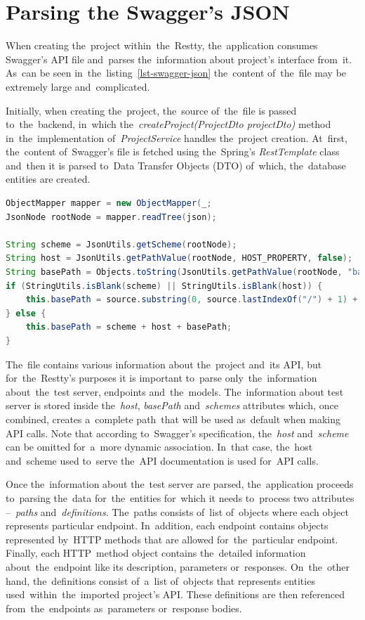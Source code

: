 \section{Parsing the Swagger's JSON}
When creating the~project within~the~Restty, the~application consumes Swagger's API file and~parses the~information
about project's interface from~it. As~can be seen in~the~listing~\ref{lst-swagger-json} the~content of~the~file may be extremely
large and~complicated. 

Initially, when creating the~project, the~source of~the~file is passed to~the~backend, in~which the~\textit{createProject(ProjectDto projectDto)}
method in~the~implementation of~\textit{ProjectService} handles the~project creation. At~first, the~content of~Swagger's file is fetched
using the~Spring's \textit{RestTemplate} class and~then it is parsed to~Data Transfer Objects (DTO) of~which, the~database entities are created.

\vspace{1mm}
\begin{lstlisting}[caption=Parsing the~address of~the~test server from~Swagger's API file.,
style=dp-default, language=Java]
ObjectMapper mapper = new ObjectMapper(_;
JsonNode rootNode = mapper.readTree(json);

String scheme = JsonUtils.getScheme(rootNode);
String host = JsonUtils.getPathValue(rootNode, HOST_PROPERTY, false);
String basePath = Objects.toString(JsonUtils.getPathValue(rootNode, "basePath", false), "");
if (StringUtils.isBlank(scheme) || StringUtils.isBlank(host)) {
	this.basePath = source.substring(0, source.lastIndexOf("/") + 1) + basePath;
} else {
	this.basePath = scheme + host + basePath;
}
\end{lstlisting}

The~file contains various information about the~project and~its API, but for~the~Restty's purposes it is important to~parse only~the~information
about~the~test server, endpoints and~the~models. The~information about test server is stored inside the~\textit{host}, \textit{basePath} and~\textit{schemes}
attributes which, once combined, creates a~complete path~that will be used as~default when making API calls. Note that according to~Swagger's specification,
the~\textit{host} and~\textit{scheme} can be omitted for~a~more dynamic association. In~that case, the~host and~scheme used to~serve the~API
documentation is used for~API calls. 

Once the~information about the~test server are parsed, the~application proceeds to~parsing the~data for~the~entities for~which it needs to~process two
attributes --~\textit{paths} and~\textit{definitions}. The~paths consists of~list of~objects where each object represents particular endpoint. In~addition,
each endpoint contains objects represented by~HTTP methods that are allowed for~the~particular endpoint. Finally, each HTTP~method object contains the~detailed
information about~the~endpoint like its description, parameters or~responses. On~the~other hand, the~definitions consist of~a~list of~objects that represents
entities used~within~the~imported project's API. These definitions are then referenced from~the~endpoints as~parameters or~response bodies.


